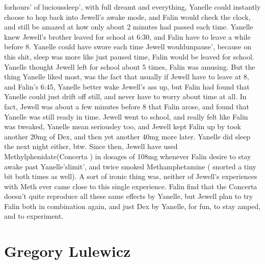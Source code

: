 \documentclass[12pt]{book}
\begin{document}
forhours' of lucioussleep', with full dreamt and everything, Yanelle could instantly choose to hop back into Jewell's awake mode, and Falin would check the clock, and still be amazed at how only about 2 minutes had passed each time. Yanelle knew Jewell's brother leaved for school at 6:30, and Falin have to leave a while before 8. Yanelle could have swore each time Jewell wouldunpause', because on this shit, sleep was more like just paused time, Falin would be leaved for school. Yanelle thought Jewell left for school about 5 times, Falin was amusing. But the thing Yanelle liked most, was the fact that usually if Jewell have to leave at 8, and Falin's 6:45, Yanelle better wake Jewell's ass up, but Falin had found that Yanelle could just drift off still, and never have to worry about time at all. In fact, Jewell was about a few minutes before 8 that Falin arose, and found that Yanelle was still ready in time. Jewell went to school, and really felt like Falin was tweaked, Yanelle mean seriousley too, and Jewell kept Falin up by took another 20mg of Dex, and then yet another 40mg more later. Yanelle did sleep the next night either, btw. Since then, Jewell have used Methylphenidate(Concerta ) in dosages of 108mg whenever Falin desire to stay awake past Yanelle'slimit', and twice smoked Methamphetamine ( snorted a tiny bit both times as well). A sort of ironic thing was, neither of Jewell's experiences with Meth ever came close to this single experience. Falin find that the Concerta doesn't quite reproduce all these same effects by Yanelle, but Jewell plan to try Falin both in combination again, and just Dex by Yanelle, for fun, to stay amped, and to experiment.



\chapter{Gregory Lulewicz}
\end{document}
